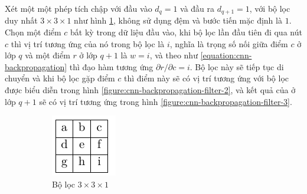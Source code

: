 Xét một một phép tích chập với đầu vào $d_q=1$ và đầu ra $d_{q+1}=1$, với bộ lọc duy nhất $3\times 3\times 1$ như hình \ref{figure:cnn-backpropagation-filter-1}, không sử dụng đệm và bước tiến mặc định là $1$. Chọn một điểm $c$ bất kỳ trong dữ liệu đầu vào, khi bộ lọc lần đầu tiên đi qua nút $c$ thì vị trí tương ứng của nó trong bộ lọc là $i$, nghĩa là trọng số nối giữa điểm $c$ ở lớp $q$ và một điểm $r$ ở lớp $q+1$ là $w=i$, và theo như \ref{equation:cnn-backpropagation} thì đạo hàm tương ứng $\partial r/\partial c=i$. Bộ lọc này sẽ tiếp tục di chuyển và khi bộ lọc gặp điểm $c$ thì điểm này sẽ có vị trí tương ứng với bộ lọc được biểu diễn trong hình \ref{figure:cnn-backpropagation-filter-2}, và kết quả của ở lớp $q+1$ sẽ có vị trí tương ứng trong hình \ref{figure:cnn-backpropagation-filter-3}.
\begin{figure}[htb]
    \centering
    \begin{subfigure}[t]{0.3\textwidth}
        \centering
        \includegraphics[width=\textwidth]{tikz_image/cnn_back_propagation_filter_1.pdf}
        \caption{Bộ lọc $3\times 3\times 1$}
        \label{figure:cnn-backpropagation-filter-1}
    \end{subfigure}\hspace{1em}
    \begin{subfigure}[t]{0.3\textwidth}
        \centering

\end{subfigure}
\end{figure}
